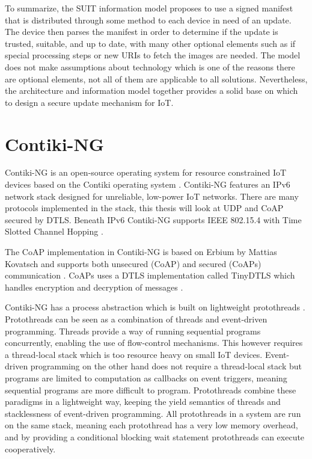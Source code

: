 \documentclass[0-thesis.tex]{subfiles}
\begin{document}
To summarize, the SUIT information model proposes to use a signed manifest that is
distributed through some method to each device in need of an update. The device then
parses the manifest in order to determine if the update is trusted, suitable, and up to
date, with many other optional elements such as if special processing steps or new URIs to
fetch the images are needed. The model does not make assumptions about technology which is
one of the reasons there are optional elements, not all of them are applicable to all
solutions. Nevertheless, the architecture and information model together provides a solid
base on which to design a secure update mechanism for IoT.

\section{Contiki-NG}
\label{sec:contiki-ng}
Contiki-NG is an open-source operating system for resource constrained IoT devices based
on the Contiki operating system \parencite{contiki-ng-github, contiki-github}. Contiki-NG
features an IPv6 network stack designed for unreliable, low-power IoT networks. There are
many protocols implemented in the stack, this thesis will look at UDP and CoAP secured by
DTLS. Beneath IPv6 Contiki-NG supports IEEE 802.15.4 with Time Slotted Channel Hopping
\parencite{ieee-802.15.4}.

The CoAP implementation in Contiki-NG is based on Erbium by Mattias Kovatsch and supports
both unsecured (CoAP) and secured (CoAPs) communication \parencite{low-power-coap}. CoAPs
uses a DTLS implementation called TinyDTLS which handles encryption and decryption of
messages \parencite{tinydtls-github}.

Contiki-NG has a process abstraction which is built on lightweight protothreads
\parencite{protothreads}. Protothreads can be seen as a combination of threads and
event-driven programming. Threads provide a way of running sequential programs
concurrently, enabling the use of flow-control mechanisms. This however requires a
thread-local stack which is too resource heavy on small IoT devices. Event-driven
programming on the other hand does not require a thread-local stack but programs are
limited to computation as callbacks on event triggers, meaning sequential programs are
more difficult to program. Protothreads combine these paradigms in a lightweight way,
keeping the yield semantics of threads and stacklessness of event-driven programming. All
protothreads in a system are run on the same stack, meaning each protothread has a very
low memory overhead, and by providing a conditional blocking wait statement protothreads
can execute cooperatively.
\end{document}
